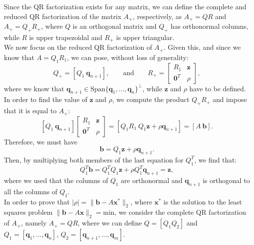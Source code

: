\documentclass[a4paper,11pt]{article}
\begin{document}
\noindent Since the QR factorization exists for any matrix, we can define the complete and reduced QR factorization of the matrix $A_{+}$, respectively, as $A_{+}=QR$ and $A_{+}=Q_{+}R_{+}$, where $Q$ is an orthogonal matrix and $Q_{+}$ has orthonormal columns, while $R$ is upper trapezoidal and $R_{+}$ is upper triangular.\\
\noindent We now focus on the reduced QR factorization of $A_{+}$. Given this, and since we know that $A=Q_{1}R_{1}$, we can pose, without loss of generality:
\begin{equation}
	Q_{+} = [Q_1\  \textbf{q}_{n+1}], \qquad \text{and} \qquad
	R_{+} = \begin{bmatrix}
		R_1& \textbf{z}  \\
		\textbf{0}^T& \rho 
	\end{bmatrix},
\end{equation}
where we know that $\textbf{q}_{n+1} \in \text{Span}\{\textbf{q}_{1},\dots,\textbf{q}_{n}\}^{\perp}$, while $\textbf{z}$ and $\rho$ have to be defined. In order to find the value of $\textbf{z}$ and $\rho$, we compute the product $Q_+ R_+$ and impose that it is equal to $A_+$:
\begin{equation}\label{key}
	[Q_1\  \textbf{q}_{n+1}] \begin{bmatrix}
		R_1& \textbf{z}  \\
		\textbf{0}^T& \rho 
	\end{bmatrix} = [Q_1 R_1\ Q_1\textbf{z} + \rho \textbf{q}_{n+1}] = [A\ \textbf{b}].
\end{equation}
Therefore, we must have 
\begin{equation}\label{key}
	\textbf{b} = Q_1 \textbf{z} + \rho \textbf{q}_{n+1}.
\end{equation}
Then, by multiplying both members of the last equation for $Q_1^T$, we find that:
\begin{equation}\label{key}
	Q_1^T \textbf{b} = Q_1^T Q_1 \textbf{z} +  \rho Q_1^T \textbf{q}_{n+1} = \textbf{z},
\end{equation}
where we used that the columns of $Q_1$ are orthonormal and $\textbf{q}_{n+1}$ is orthogonal to all the columns of $Q_1$.\\
In order to prove that $|\rho| = \lVert \textbf{b} - A \textbf{x}^*\rVert_2$, where $\textbf{x}^*$ is the solution to the least squares problem $\lVert \textbf{b} - A \textbf{x}\rVert_2= \text{min} $, we consider the complete QR factorization of $A_+$, namely $A_+= QR$, where we can define $Q=[Q_{1}Q_{2}]$ and $Q_{1}=[\textbf{q}_{1},\dots,\textbf{q}_{n}]$, $Q_{2}=[\textbf{q}_{n+1},\dots,\textbf{q}_{m}]$.
\end{document}
